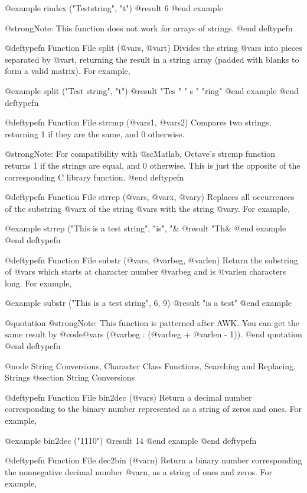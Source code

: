 {{{{@example
rindex ("Teststring", "t")
     @result{} 6
@end example

@strong{Note:}  This function does not work for arrays of strings.
@end deftypefn

@deftypefn {Function File} {} split (@var{s}, @var{t})
Divides the string @var{s} into pieces separated by @var{t}, returning
the result in a string array (padded with blanks to form a valid
matrix).  For example,

@example
split ("Test string", "t")
     @result{} "Tes "
        " s  "
        "ring"
@end example
@end deftypefn

@deftypefn {Function File} {} strcmp (@var{s1}, @var{s2})
Compares two strings, returning 1 if they are the same, and 0 otherwise.

@strong{Note:}  For compatibility with @sc{Matlab}, Octave's strcmp
function returns 1 if the strings are equal, and 0 otherwise.  This is
just the opposite of the corresponding C library function.
@end deftypefn

@deftypefn {Function File} {} strrep (@var{s}, @var{x}, @var{y})
Replaces all occurrences of the substring @var{x} of the string @var{s}
with the string @var{y}.  For example,

@example
strrep ("This is a test string", "is", "&%
     @result{} "Th&%
@end example
@end deftypefn

@deftypefn {Function File} {} substr (@var{s}, @var{beg}, @var{len})
Return the substring of @var{s} which starts at character number
@var{beg} and is @var{len} characters long.  For example,

@example
substr ("This is a test string", 6, 9)
     @result{} "is a test"
@end example

@quotation
@strong{Note:}
This function is patterned after AWK.  You can get the same result by
@code{@var{s} (@var{beg} : (@var{beg} + @var{len} - 1))}.  
@end quotation
@end deftypefn

@node String Conversions, Character Class Functions, Searching and Replacing, Strings
@section String Conversions

@deftypefn {Function File} {} bin2dec (@var{s})
Return a decimal number corresponding to the binary number
represented as a string of zeros and ones.  For example,

@example
bin2dec ("1110")
     @result{} 14
@end example
@end deftypefn

@deftypefn {Function File} {} dec2bin (@var{n})
Return a binary number corresponding the nonnegative decimal number
@var{n}, as a string of ones and zeros.  For example,

}}}}

